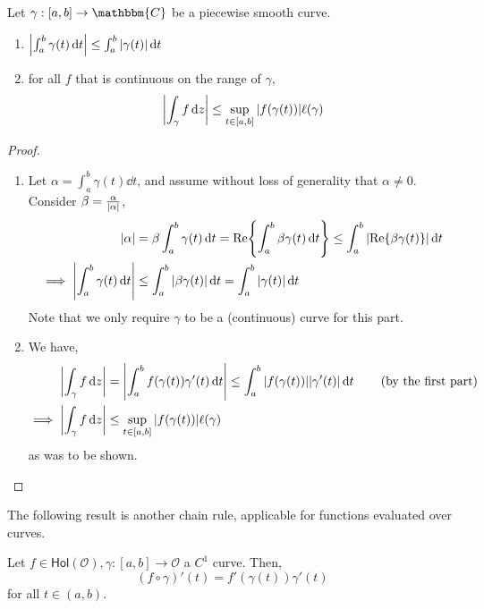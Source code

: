\documentclass[../ComplexAnalysis_Notes.tex]{subfiles}
\begin{document}
\begin{Thm}{}{}
Let \( \gamma: [a,b] \to \mathbbm{C} \) be a piecewise smooth curve.
\begin{enumerate}[label = (\arabic*)]
  \item \( \abs{\int_a^b \gamma(t) \dd{t}} \leq \int_a^b \abs{\gamma(t)} \dd{t} \)
  \item for all \( f \) that is continuous on the range of \( \gamma \),
  \[ 
   \abs{\int_\gamma f \dd{z}} \leq \sup_{t \in [a,b]} \abs{f(\gamma(t))} \ell(\gamma)
   \]
\end{enumerate}
\end{Thm}

\begin{proof} 
\begin{enumerate}[label = (\arabic*)]
  \item Let \( \alpha = \int_a^b \gamma(t) \dd{t} \), and assume without loss of generality that \( \alpha \neq 0 \). Consider \( \beta = \frac{\alpha}{\abs{\alpha}} \),
  \begin{align*}
     \abs{\alpha} 
     &= \beta \int_a^b \gamma(t) \dd{t} = \Re{\int_a^b \beta \gamma(t) \dd{t}} \leq \int_a^b \abs{\Re{\beta \gamma(t)}} \dd{t} \\
     \implies \abs{\int_a^b \gamma(t) \dd{t}} &\leq \int_a^b \abs{\beta \gamma(t)} \dd{t} = \int_a^b \abs{\gamma(t)} \dd{t}
  \end{align*}
  Note that we only require \( \gamma \) to be a (continuous) curve for this part.

  \item We have,
  \begin{align*}
     \abs{\int_\gamma f \dd{z}} 
     &= \abs{\int_a^b f(\gamma(t))\gamma'(t) \dd{t}} \leq \int_a^b \abs{f(\gamma(t))} \abs{\gamma'(t)} \dd{t} \tag{by the first part} \\
     \implies \abs{\int_\gamma f \dd{z}} & \leq \sup_{t \in [a,b]} \abs{f(\gamma(t))} \ell(\gamma)
  \end{align*}
  as was to be shown.
\end{enumerate} 
\end{proof}

The following result is another chain rule, applicable for functions evaluated over curves.

\begin{Thm}{}{}
 Let \( f \in \textsf{Hol}(\mathcal{O}), \gamma: [a,b] \to \mathcal{O} \) a \( C^1 \) curve. Then,
\[ 
 (f \circ \gamma)'(t) = f'(\gamma(t))\gamma'(t)
 \]
 for all \( t \in (a,b) \).
 \end{Thm}
\end{document}
